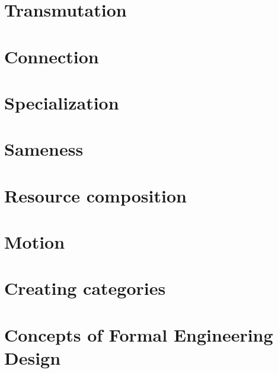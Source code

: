 \documentclass[paper=6in:9in,pagesize=pdftex,
 headinclude=off,footinclude=on,11pt,twoside]{scrbook}
\begin{document}

\setcounter{tocdepth}{1}
\tableofcontents

% 

\chapter{Transmutation}

\clearpage

\chapter{Connection}

\clearpage

\chapter{Specialization}

\clearpage
%
\chapter{Sameness}

\clearpage
%

\chapter{Resource composition}


\clearpage
%

\chapter{Motion}

\clearpage
%

\chapter{Creating categories}

\clearpage

\chapter{Concepts of  Formal Engineering Design}

\clearpage
%
\end{document}
